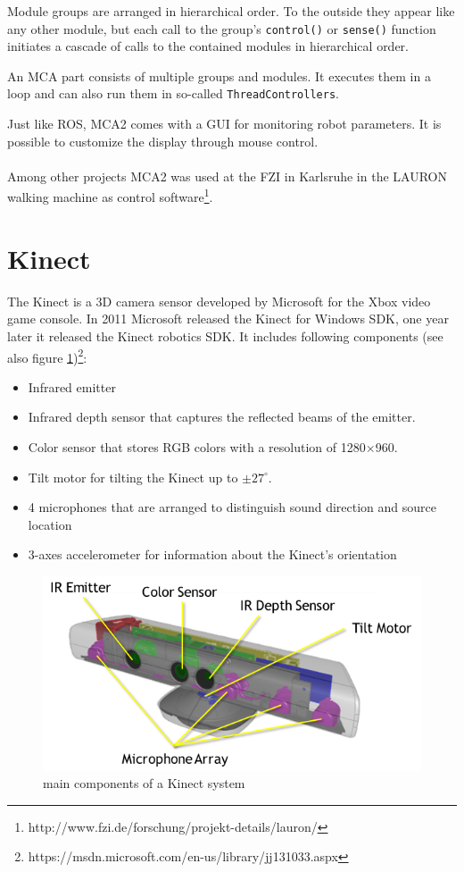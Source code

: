 Module groups are arranged in hierarchical order. To the outside they appear like any other module, but each call to the group's \texttt{control()} or \texttt{sense()} function initiates a cascade of calls to the contained modules in hierarchical order.

An MCA part consists of multiple groups and modules. It executes them in a loop and can also run them in so-called \texttt{ThreadControllers}.

Just like ROS, MCA2 comes with a GUI for monitoring robot parameters. It is possible to customize the display through mouse control.
\\\\
Among other projects MCA2 was used at the FZI in Karlsruhe in the LAURON walking machine as control software\footnote{http://www.fzi.de/forschung/projekt-details/lauron/}.

\section{Kinect}
The Kinect is a 3D camera sensor developed by Microsoft for the Xbox video game console. In 2011 Microsoft released the Kinect for Windows SDK, one year later it released the Kinect robotics SDK. It includes following components (see also figure \ref{Kinect})\footnote{https://msdn.microsoft.com/en-us/library/jj131033.aspx}:

\begin{itemize}
\item Infrared emitter
\item Infrared depth sensor that captures the reflected beams of the emitter.
\item Color sensor that stores RGB colors with a resolution of 1280$\times$960.
\item Tilt motor for tilting the Kinect up to $\pm 27^\circ$.
\item 4 microphones that are arranged to distinguish sound direction and source location
\item 3-axes accelerometer for information about the Kinect's orientation
\end{itemize}

\begin{figure}[ht]
\centering
\includegraphics[scale=0.425]{graphics/kinect.png}
\caption{main components of a Kinect system}
\label{Kinect}
\centering
\end{figure}

